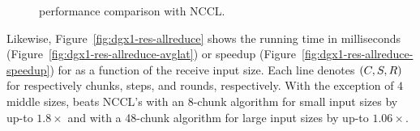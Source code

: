\begin{figure}[tbp]
  \centering
  \hfill
  \caption{\alltoall performance comparison with NCCL.}
  \label{fig:dgx1-res-alltoall}
\end{figure}

Likewise, Figure~\ref{fig:dgx1-res-allreduce} shows the running time
in milliseconds (Figure~\ref{fig:dgx1-res-allreduce-avglat}) or
speedup (Figure~\ref{fig:dgx1-res-allreduce-speedup}) for \allreduce
as a function of the receive input size.  Each line denotes $(C,
S, R)$ for respectively chunks, steps, and rounds,
respectively. With the exception of $4$ middle sizes, \tool{} beats
NCCL's \allreduce with an 8-chunk algorithm for small input sizes by
up-to $1.8\times$ and with a 48-chunk algorithm for large input sizes
by up-to $1.06\times$.

